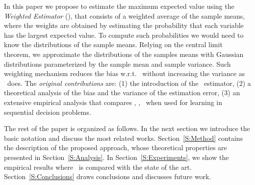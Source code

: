In this paper we propose to estimate the maximum expected value using the \emph{Weighted Estimator} (\WE), that consists of a weighted average of the sample means, where the weights are obtained by estimating the probability that each variable has the largest expected value.
To compute such probabilities we would need to know the distributions of the sample means.
Relying on the central limit theorem, we approximate the distributions of the samples means with Gaussian distributions parameterized by the sample mean and sample variance.
Such weighting mechanism reduces the bias w.r.t. \ME~without increasing the variance as \CV~does.
The \emph{original contributions} are: (1) the introduction of the \WE~estimator, (2) a theoretical analysis of the bias and the variance of the estimation error, (3) an extensive empirical analysis that compares \ME, \CV, \WE~when used for learning in sequential decision problems.

The rest of the paper is organized as follows.
In the next section we introduce the basic notation and discuss the most related works.
Section~\ref{S:Method} contains the description of the proposed approach, whose theoretical properties are presented in Section~\ref{S:Analysis}.
In Section~\ref{S:Experiments}, we show the empirical results where \WE~is compared with the state of the art.
Section~\ref{S:Conclusions} draws conclusions and discusses future work.